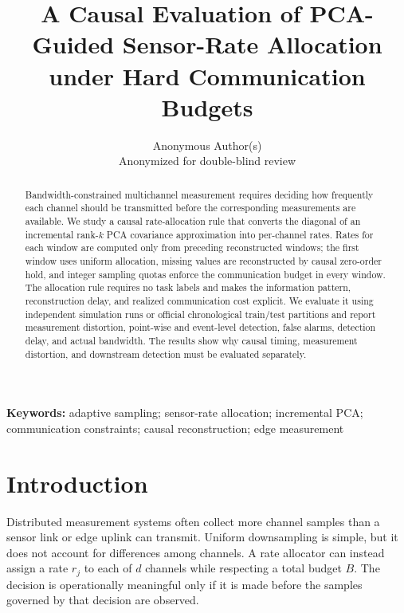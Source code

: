 \documentclass[12pt]{article}
\begin{document}
\title{A Causal Evaluation of PCA-Guided Sensor-Rate Allocation under Hard Communication Budgets}
\author{Anonymous Author(s)\\Anonymized for double-blind review}
\date{}
\maketitle

\begin{abstract}
Bandwidth-constrained multichannel measurement requires deciding how frequently
each channel should be transmitted before the corresponding measurements are
available. We study a causal rate-allocation rule that converts the diagonal of
an incremental rank-$k$ PCA covariance approximation into per-channel rates.
Rates for each window are computed only from preceding reconstructed windows;
the first window uses uniform allocation, missing values are reconstructed by
causal zero-order hold, and integer sampling quotas enforce the communication
budget in every window. The allocation rule requires no task labels and makes
the information pattern, reconstruction delay, and realized communication cost
explicit. We evaluate it using independent simulation runs or official
chronological train/test partitions and report measurement distortion,
point-wise and event-level detection, false alarms, detection delay, and actual
bandwidth. 
The results show why causal timing, measurement distortion, and downstream
detection must be evaluated separately.
\end{abstract}

\noindent\textbf{Keywords:} adaptive sampling; sensor-rate allocation;
incremental PCA; communication constraints; causal reconstruction; edge measurement

\linenumbers

\section{Introduction}

Distributed measurement systems often collect more channel samples than a
sensor link or edge uplink can transmit. Uniform downsampling is simple, but it
does not account for differences among channels. A rate allocator can instead
assign a rate $r_j$ to each of $d$ channels while respecting a total budget
$B$. The decision is operationally meaningful only if it is made before the
samples governed by that decision are observed.
\end{document}
